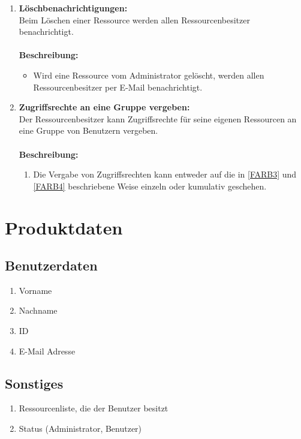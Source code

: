 \documentclass[parskip=full,11pt]{scrartcl}
\def\threedigits#1{%
  \ifnum#1<10 0\fi
  \ifnum#1<1 0\fi
  \number#1}
\begin{document}
\begin{enumerate}[label={\textbf{/F\protect\threedigits{\theenumi}0/}}, leftmargin=*, resume]
\item \label{FARB7} \colorbox{shadecolor} {\textbf{Löschbenachrichtigungen:}}\\
Beim Löschen einer Ressource werden allen Ressourcenbesitzer benachrichtigt.\\\\
\textbf{Beschreibung:}\\
\begin{itemize}[itemsep=0pt, leftmargin=*]
\item Wird eine Ressource vom Administrator gelöscht, werden allen Ressourcenbesitzer per E-Mail benachrichtigt.
\end{itemize}

\newpage
\item \label{FARB8} \colorbox{shadecolor} {\textbf{Zugriffsrechte an eine Gruppe vergeben:}}\\
Der Ressourcenbesitzer kann Zugriffsrechte für seine eigenen Ressourcen an eine Gruppe von Benutzern vergeben.\\\\
\textbf{Beschreibung:}\\
\begin{enumerate}[label=(\arabic*), leftmargin=*]
\item Die Vergabe von Zugriffsrechten kann entweder auf die in \ref{FARB3} und \ref{FARB4} beschriebene Weise einzeln oder kumulativ geschehen.
\end{enumerate}

\end{enumerate}


\section{Produktdaten}
\subsection{Benutzerdaten}
\begin{enumerate}[label={\textbf{/D\protect\threedigits{\theenumi}0/}}, leftmargin=*]
     		\item Vorname
     		\item Nachname
     		\item ID
     		\item E-Mail Adresse 
\end{enumerate}
     		 
\subsection{Sonstiges}
\begin{enumerate}[label={\textbf{/D\protect\threedigits{\theenumi}0/}}, leftmargin=*, resume]
		\item Ressourcenliste, die der Benutzer besitzt
        	\item Status (Administrator, Benutzer)     
\end{enumerate}
\end{document}
